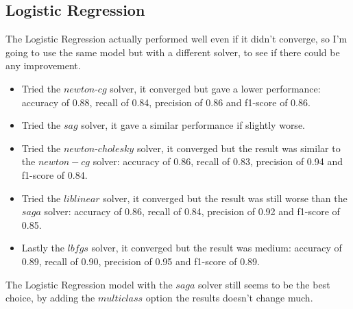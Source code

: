 \documentclass{article}
\begin{document}
\begin{titlepage}
  \section{Logistic Regression}
  The Logistic Regression actually performed well even if it didn't converge, so I'm going to use the same model but with a different solver, to see if there could be any improvement.

  \begin{itemize}
    \item Tried the $newton$-$cg$ solver, it converged but gave a lower performance: accuracy of 0.88, recall of 0.84, precision of 0.86 and f1-score of 0.86.
    \item Tried the $sag$ solver, it gave a similar performance if slightly worse.
    \item Tried the $newton$-$cholesky$ solver, it converged but the result was similar to the $newton-cg$ solver: accuracy of 0.86, recall of 0.83, precision of 0.94 and f1-score of 0.84.
    \item Tried the $liblinear$ solver, it converged but the result was still worse than the $saga$ solver: accuracy of 0.86, recall of 0.84, precision of 0.92 and f1-score of 0.85.
    \item Lastly the $lbfgs$ solver, it converged but the result was medium: accuracy of 0.89, recall of 0.90, precision of 0.95 and f1-score of 0.89.
  \end{itemize}

  The Logistic Regression model with the $saga$ solver still seems to be the best choice, by adding the $multiclass$ option the results doesn't change much.


\end{titlepage}
\end{document}
